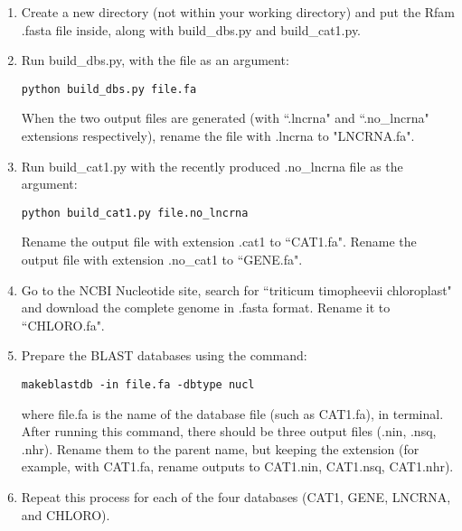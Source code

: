 \documentclass[12pt,titlepage]{article}
\begin{document}
\begin{enumerate}
\item Create a new directory (not within your working directory) and put the Rfam .fasta file inside, along with build\_dbs.py and build\_cat1.py. 
\item Run build\_dbs.py, with the file as an argument: 
\begin{tcolorbox}
\begin{lstlisting}
python build_dbs.py file.fa
\end{lstlisting}
\end{tcolorbox} When the two output files are generated (with ``.lncrna" and ``.no\_lncrna" extensions respectively), rename the file with .lncrna to "LNCRNA.fa".  
\item Run build\_cat1.py with the recently produced .no\_lncrna file as the argument:
\begin{tcolorbox}
\begin{lstlisting}
python build_cat1.py file.no_lncrna
\end{lstlisting}
\end{tcolorbox}Rename the output file with extension .cat1 to ``CAT1.fa". Rename the output file with extension .no\_cat1 to ``GENE.fa".
\item Go to the NCBI Nucleotide site, search for ``triticum timopheevii chloroplast" and download the complete genome in .fasta format. Rename it to ``CHLORO.fa".
\item Prepare the BLAST databases using the command:
\begin{tcolorbox}
\begin{lstlisting}
makeblastdb -in file.fa -dbtype nucl
\end{lstlisting}
\end{tcolorbox}
where file.fa is the name of the database file (such as CAT1.fa), in terminal. After running this command, there should be three output files (.nin, .nsq, .nhr). Rename them to the parent name, but keeping the extension (for example, with CAT1.fa, rename outputs to CAT1.nin, CAT1.nsq, CAT1.nhr). 
\item Repeat this process for each of the four databases (CAT1, GENE, LNCRNA, and CHLORO).
\end{enumerate} 
\end{document}
